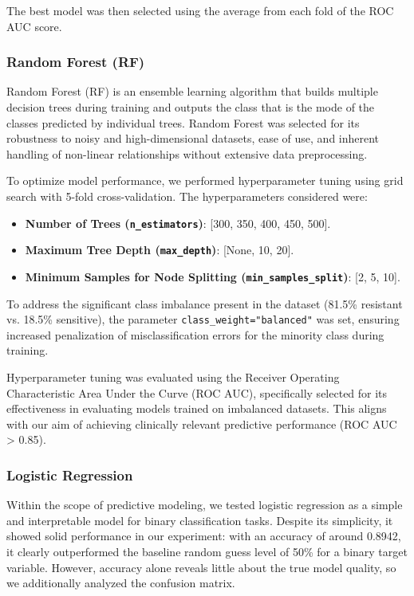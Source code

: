 \documentclass{article}
\begin{document}
The best model was then selected using the average from each fold of the ROC AUC score. 

\hfill\break
\hfill\break


\subsubsection{Random Forest (RF)}
Random Forest (RF) is an ensemble learning algorithm that builds multiple decision trees during training and outputs the class that is the mode of the classes predicted by individual trees. Random Forest was selected for its robustness to noisy and high-dimensional datasets, ease of use, and inherent handling of non-linear relationships without extensive data preprocessing.

To optimize model performance, we performed hyperparameter tuning using grid search with 5-fold cross-validation. The hyperparameters considered were:

\begin{itemize}
    \item \textbf{Number of Trees (\texttt{n\_estimators})}: [300, 350, 400, 450, 500].
    \item \textbf{Maximum Tree Depth (\texttt{max\_depth})}: [None, 10, 20].
    \item \textbf{Minimum Samples for Node Splitting (\texttt{min\_samples\_split})}: [2, 5, 10].
\end{itemize}

To address the significant class imbalance present in the dataset (81.5\% resistant vs. 18.5\% sensitive), the parameter \texttt{class\_weight="balanced"} was set, ensuring increased penalization of misclassification errors for the minority class during training.

Hyperparameter tuning was evaluated using the Receiver Operating Characteristic Area Under the Curve (ROC AUC), specifically selected for its effectiveness in evaluating models trained on imbalanced datasets. This aligns with our aim of achieving clinically relevant predictive performance (ROC AUC > 0.85).

\subsubsection{Logistic Regression}

Within the scope of predictive modeling, we tested logistic regression as a simple and interpretable model for binary classification tasks. Despite its simplicity, it showed solid performance in our experiment: with an accuracy of around 0.8942, it clearly outperformed the baseline random guess level of 50\% for a binary target variable. However, accuracy alone reveals little about the true model quality, so we additionally analyzed the confusion matrix.
\end{document}
